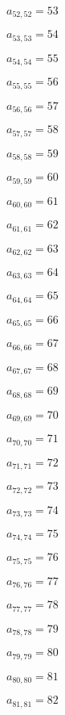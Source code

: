 \documentclass[a4paper,12pt]{article}
\begin{document}
$a _{ 52, 52 } = 53$

$a _{ 53, 53 } = 54$

$a _{ 54, 54 } = 55$

$a _{ 55, 55 } = 56$

$a _{ 56, 56 } = 57$

$a _{ 57, 57 } = 58$

$a _{ 58, 58 } = 59$

$a _{ 59, 59 } = 60$

$a _{ 60, 60 } = 61$

$a _{ 61, 61 } = 62$

$a _{ 62, 62 } = 63$

$a _{ 63, 63 } = 64$

$a _{ 64, 64 } = 65$

$a _{ 65, 65 } = 66$

$a _{ 66, 66 } = 67$

$a _{ 67, 67 } = 68$

$a _{ 68, 68 } = 69$

$a _{ 69, 69 } = 70$

$a _{ 70, 70 } = 71$

$a _{ 71, 71 } = 72$

$a _{ 72, 72 } = 73$

$a _{ 73, 73 } = 74$

$a _{ 74, 74 } = 75$

$a _{ 75, 75 } = 76$

$a _{ 76, 76 } = 77$

$a _{ 77, 77 } = 78$

$a _{ 78, 78 } = 79$

$a _{ 79, 79 } = 80$

$a _{ 80, 80 } = 81$

$a _{ 81, 81 } = 82$
\end{document}

